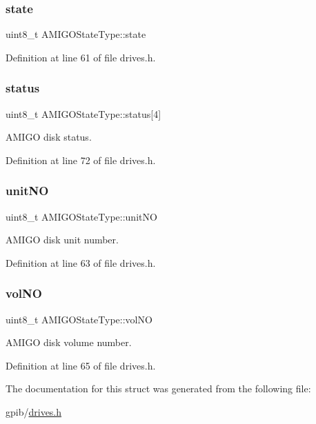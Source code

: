 \subsubsection{\texorpdfstring{state}{state}}
{\footnotesize\ttfamily uint8\+\_\+t A\+M\+I\+G\+O\+State\+Type\+::state}



Definition at line 61 of file drives.\+h.

\mbox{\label{structAMIGOStateType_a20ecb3cbbcb1fe4746c2d38edc125412}} 
\subsubsection{\texorpdfstring{status}{status}}
{\footnotesize\ttfamily uint8\+\_\+t A\+M\+I\+G\+O\+State\+Type\+::status\mbox{[}4\mbox{]}}



A\+M\+I\+GO disk status. 



Definition at line 72 of file drives.\+h.

\mbox{\label{structAMIGOStateType_a3d0cc02f8822c817feddf93dd08a5034}} 
\subsubsection{\texorpdfstring{unit\+NO}{unitNO}}
{\footnotesize\ttfamily uint8\+\_\+t A\+M\+I\+G\+O\+State\+Type\+::unit\+NO}



A\+M\+I\+GO disk unit number. 



Definition at line 63 of file drives.\+h.

\mbox{\label{structAMIGOStateType_a9825e282ac5844225a43b7f0835da67f}} 
\subsubsection{\texorpdfstring{vol\+NO}{volNO}}
{\footnotesize\ttfamily uint8\+\_\+t A\+M\+I\+G\+O\+State\+Type\+::vol\+NO}



A\+M\+I\+GO disk volume number. 



Definition at line 65 of file drives.\+h.



The documentation for this struct was generated from the following file\+:\begin{DoxyCompactItemize}
\item 
gpib/\hyperlink{drives_8h}{drives.\+h}\end{DoxyCompactItemize}
